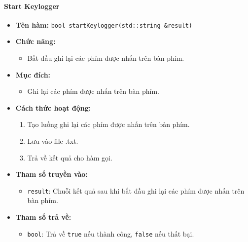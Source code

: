 \paragraph{Start Keylogger}
\begin{itemize}
    \item \textbf{Tên hàm:} \texttt{bool startKeylogger(std::string \&result)}
    \item \textbf{Chức năng:}
    \begin{itemize}
        \item Bắt đầu ghi lại các phím được nhấn trên bàn phím.
    \end{itemize}
    \item \textbf{Mục đích:}
    \begin{itemize}
        \item Ghi lại các phím được nhấn trên bàn phím.
    \end{itemize}
    \item \textbf{Cách thức hoạt động:}
    \begin{enumerate}
        \item Tạo luồng ghi lại các phím được nhấn trên bàn phím.
        \item Lưu vào file .txt.
        \item Trả về kết quả cho hàm gọi.
    \end{enumerate}
    \item \textbf{Tham số truyền vào:}
    \begin{itemize}
        \item \texttt{result}: Chuỗi kết quả sau khi bắt đầu ghi lại các phím được nhấn trên bàn phím.
    \end{itemize}
    \item \textbf{Tham số trả về:}
    \begin{itemize}
        \item \texttt{bool}: Trả về \texttt{true} nếu thành công, \texttt{false} nếu thất bại.
    \end{itemize}
\end{itemize}

